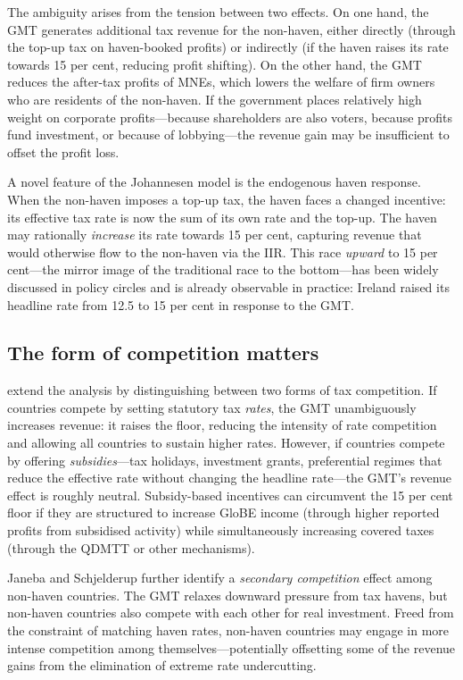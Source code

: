 \documentclass[12pt,a4paper]{article}
\begin{document}
The ambiguity arises from the tension between two effects.
On one hand, the GMT generates additional tax revenue for the non-haven, either directly (through the top-up tax on haven-booked profits) or indirectly (if the haven raises its rate towards 15 per cent, reducing profit shifting).
On the other hand, the GMT reduces the after-tax profits of MNEs, which lowers the welfare of firm owners who are residents of the non-haven.
If the government places relatively high weight on corporate profits---because shareholders are also voters, because profits fund investment, or because of lobbying---the revenue gain may be insufficient to offset the profit loss.

A novel feature of the Johannesen model is the endogenous haven response.
When the non-haven imposes a top-up tax, the haven faces a changed incentive: its effective tax rate is now the sum of its own rate and the top-up.
The haven may rationally \emph{increase} its rate towards 15 per cent, capturing revenue that would otherwise flow to the non-haven via the IIR.
This race \emph{upward} to 15 per cent---the mirror image of the traditional race to the bottom---has been widely discussed in policy circles and is already observable in practice: Ireland raised its headline rate from 12.5 to 15 per cent in response to the GMT.

\subsection{The form of competition matters}

\textcite{janeba2023} extend the analysis by distinguishing between two forms of tax competition.
If countries compete by setting statutory tax \emph{rates}, the GMT unambiguously increases revenue: it raises the floor, reducing the intensity of rate competition and allowing all countries to sustain higher rates.
However, if countries compete by offering \emph{subsidies}---tax holidays, investment grants, preferential regimes that reduce the effective rate without changing the headline rate---the GMT's revenue effect is roughly neutral.
Subsidy-based incentives can circumvent the 15 per cent floor if they are structured to increase GloBE income (through higher reported profits from subsidised activity) while simultaneously increasing covered taxes (through the QDMTT or other mechanisms).

Janeba and Schjelderup further identify a \emph{secondary competition} effect among non-haven countries.
The GMT relaxes downward pressure from tax havens, but non-haven countries also compete with each other for real investment.
Freed from the constraint of matching haven rates, non-haven countries may engage in more intense competition among themselves---potentially offsetting some of the revenue gains from the elimination of extreme rate undercutting.
\end{document}
